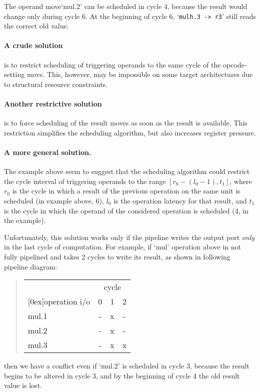 \documentclass[a4paper,twoside]{tce}
\begin{document}
The operand move`mul.2' can be scheduled in cycle 4, because the result
would change only during cycle 6. At the beginning of cycle 6,
`\verb|mulh.3 -> r3|' still reads the correct old value.

\paragraph{A crude solution} is to restrict scheduling of triggering
operands to the same cycle of the opcode-setting move. This, however, may be
impossible on some target architectures due to structural resource
constraints.

\paragraph{Another restrictive solution} is to force scheduling of the
result moves as soon as the result is available. This restriction simplifies
the scheduling algorithm, but also increases register pressure.

\paragraph{A more general solution.}
The example above seem to suggest that the scheduling algorithm could
restrict the cycle interval of triggering operands to the range $[r_{0} -
(l_{0}-1),t_{1}]$, where $r_{0}$ is the cycle in which a result of the
previous operation on the same unit is scheduled (in example above, 6),
$l_{0}$ is the operation latency for that result, and $t_{1}$ is the cycle
in which the operand of the considered operation is scheduled (4, in the
example).

Unfortunately, this solution works only if the pipeline writes the output
port \emph{only} in the last cycle of computation. For example, if `mul'
operation above in not fully pipelined and takes 2 cycles to write its
result, as shown in following pipeline diagram:
\begin{quote}
\begin{tabular}{|l|c|c|c|}
\hline
                & \multicolumn{3}{c|}{cycle} \\
\cline{2-4}
  \raisebox{1.5ex}[0ex]{operation i/o} & 0 & 1 & 2 \\
\hline
  mul.1         &  - & x & - \\
\hline
  mul.2         &  - & x & - \\
\hline
  mul.3         &  - & x & x \\
\hline
\end{tabular}
\end{quote}
then we have a conflict even if `mul.2' is scheduled in cycle 3, because the
result begins to be altered in cycle 3, and by the beginning of cycle 4 the
old result value is lost.
\end{document}
